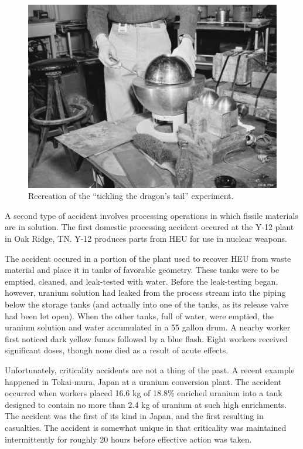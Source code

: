 \begin{figure}[ht] 
    \centering
    \includegraphics[keepaspectratio, width = 4.0 in]{images/pu_sphere_2}
    \caption{Recreation of the ``tickling the dragon's tail'' 
             experiment.}
    \label{fig:pu_sphere_2}
\end{figure}


A second type of accident involves processing operations in which
fissile materials are in solution.  The first domestic processing
accident occured at the Y-12 plant in Oak Ridge, TN.  Y-12 
produces parts from HEU for use in nuclear weapons.  

The accident occured in a portion of the plant used to 
recover HEU from waste material and place it in tanks of favorable
geometry.  These tanks were to be emptied, cleaned, and leak-tested 
with water.  Before the leak-testing began, however, uranium 
solution had leaked from the process stream into the piping
below the storage tanks (and actually into one of the tanks,
as its release valve had been let open).  When the other tanks, full
of water, were emptied, the uranium solution and water accumulated
in a 55 gallon drum.  A nearby worker first noticed dark yellow
fumes followed by a blue flash.  Eight workers received significant
doses, though none died as a result of acute effects.

Unfortunately, criticality accidents are not a thing of the past.  A 
recent example happened in Tokai-mura, Japan at a uranium conversion
plant.  The accident occurred when workers placed 16.6 kg of 18.8\%
enriched uranium into a tank designed to contain no more than
2.4 kg of uranium at such high enrichments.  The accident was the 
first of its kind in Japan, and the first resulting in casualties.
The accident is somewhat unique in that criticality was maintained
intermittently for roughly 20 hours before effective action was
taken.  

